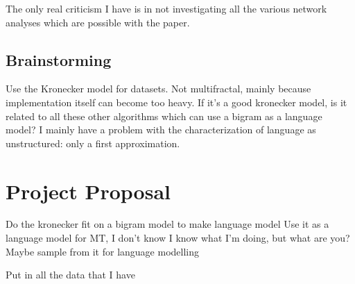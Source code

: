 \documentclass[12pt]{article}
\begin{document}
The only real criticism I have is in not investigating all the various network analyses which are possible with the paper.
\subsection{Brainstorming}

Use the Kronecker model for datasets. Not multifractal, mainly because implementation itself can become too heavy. If it's a good kronecker model, is it related to all these other algorithms which can use a bigram as a language model? I mainly have a problem with the characterization of language as unstructured: only a first approximation.

\section{Project Proposal}
Do the kronecker fit on a bigram model to make language model
Use it as a language model for MT, I don't know
I know what I'm doing, but what are you?
Maybe sample from it for language modelling

Put in all the data that I have
\end{document}
